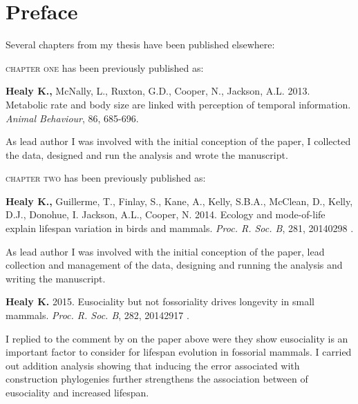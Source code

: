 \chapter*{Preface} %

Several chapters from my thesis have been published elsewhere:

\textsc{chapter one} has been previously published as:
%
\begin{previouspaper}
  \textbf{Healy K.,} McNally, L., Ruxton, G.D., Cooper, N., Jackson, A.L. 2013. Metabolic rate and body size are linked with perception of temporal information. \textit{Animal Behaviour}, 86, 685-696.
\end{previouspaper}
 
As lead author I was involved with the initial conception of the paper, I collected the data, designed and run the analysis and wrote the manuscript.


{}
\textsc{chapter two} has been previously published as:
%
\begin{previouspaper}
  \textbf{Healy K.,} Guillerme, T., Finlay, S., Kane, A., Kelly, S.B.A., McClean, D., Kelly, D.J., Donohue, I. Jackson, A.L., Cooper, N. 2014. Ecology and mode-of-life explain lifespan variation in birds and mammals. \textit{Proc. R. Soc. B}, 281, 20140298 .
\end{previouspaper}

As lead author I was involved with the initial conception of the paper, lead collection and management of the data, designing and running the analysis and writing the manuscript.

\begin{previouspaper}
  \textbf{Healy K.} 2015. Eusociality but not fossoriality drives longevity in small mammals. \textit{Proc. R. Soc. B}, 282, 20142917 .
\end{previouspaper}

I replied to the comment by \citep{williams2015ecology} on the paper above were they show eusociality is an important factor to consider for lifespan evolution in fossorial mammals. I carried out addition analysis showing that inducing the error associated with construction phylogenies further strengthens the association between of eusociality and increased lifespan.


